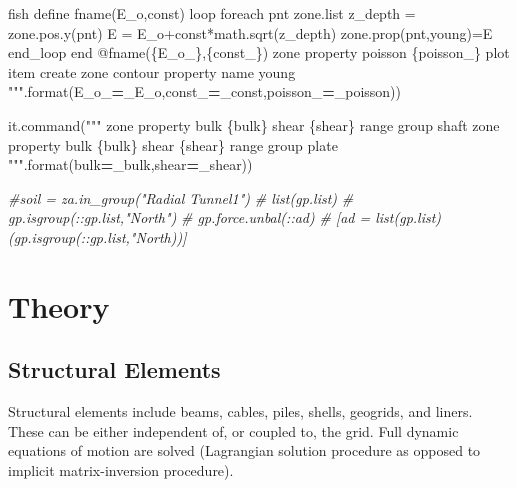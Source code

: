 \documentclass[a4paper, nobind]{templates/ociamthesis}
\newenvironment{Shaded}{\begin{snugshade}}{\end{snugshade}}
\newcommand{\BuiltInTok}[1]{#1}
\newcommand{\CommentTok}[1]{\textcolor[rgb]{0.56,0.35,0.01}{\textit{#1}}}
\newcommand{\NormalTok}[1]{#1}
\newcommand{\OperatorTok}[1]{\textcolor[rgb]{0.81,0.36,0.00}{\textbf{#1}}}
\newcommand{\SpecialCharTok}[1]{\textcolor[rgb]{0.00,0.00,0.00}{#1}}
\newcommand{\StringTok}[1]{\textcolor[rgb]{0.31,0.60,0.02}{#1}}
\renewenvironment{Shaded}
{
  \vspace{10pt}%
  \begin{snugshade}%
}{%
  \end{snugshade}%
  \vspace{8pt}%
}
\begin{document}
\begin{Shaded}
\begin{Highlighting}[]
\StringTok{fish define fname(E\_o,const)}
\StringTok{loop foreach pnt zone.list}
\StringTok{z\_depth = zone.pos.y(pnt)}
\StringTok{E = E\_o+const*math.sqrt(z\_depth)}
\StringTok{zone.prop(pnt,\textquotesingle{}young\textquotesingle{})=E}
\StringTok{end\_loop}
\StringTok{end}
\StringTok{@fname(}\SpecialCharTok{\{E\_o\_\}}\StringTok{,}\SpecialCharTok{\{const\_\}}\StringTok{)}
\StringTok{zone property poisson }\SpecialCharTok{\{poisson\_\}}
\StringTok{plot item create zone contour property name \textquotesingle{}young\textquotesingle{}}
\StringTok{"""}\NormalTok{.}\BuiltInTok{format}\NormalTok{(E\_o\_}\OperatorTok{=}\NormalTok{\_E\_o,const\_}\OperatorTok{=}\NormalTok{\_const,poisson\_}\OperatorTok{=}\NormalTok{\_poisson))}

\NormalTok{it.command(}\StringTok{"""}
\StringTok{zone property bulk }\SpecialCharTok{\{bulk\}}\StringTok{  shear }\SpecialCharTok{\{shear\}}\StringTok{ range group \textquotesingle{}shaft\textquotesingle{}}
\StringTok{zone property bulk }\SpecialCharTok{\{bulk\}}\StringTok{  shear }\SpecialCharTok{\{shear\}}\StringTok{ range group \textquotesingle{}plate\textquotesingle{}}
\StringTok{"""}\NormalTok{.}\BuiltInTok{format}\NormalTok{(bulk}\OperatorTok{=}\NormalTok{\_bulk,shear}\OperatorTok{=}\NormalTok{\_shear))}

\CommentTok{\#soil = za.in\_group("Radial Tunnel1")}
\CommentTok{\# list(gp.list)}
\CommentTok{\# gp.isgroup(::gp.list,"North")}
\CommentTok{\# gp.force.unbal(::ad)}
\CommentTok{\# [ad = list(gp.list)(gp.isgroup(::gp.list,"North))]}
\end{Highlighting}
\end{Shaded}

\newpage

\hypertarget{theory}{%
\chapter{Theory}\label{theory}}

\hypertarget{structural-elements-1}{%
\section{Structural Elements}\label{structural-elements-1}}

Structural elements include beams, cables, piles, shells, geogrids, and
liners. These can be either independent of, or coupled to, the grid.
Full dynamic equations of motion are solved (Lagrangian solution
procedure as opposed to implicit matrix-inversion procedure).
\end{document}
